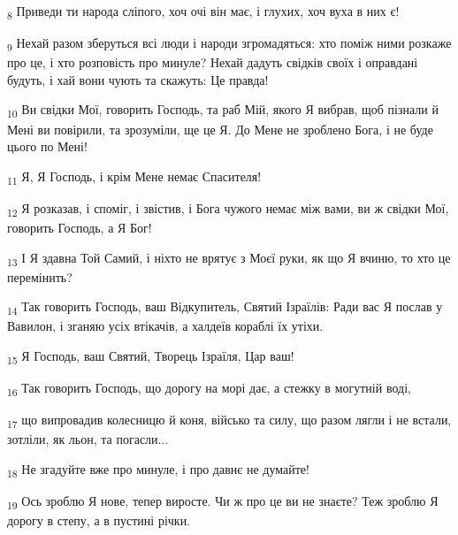 \begin{tcolorbox}
\textsubscript{8} Приведи ти народа сліпого, хоч очі він має, і глухих, хоч вуха в них є!
\end{tcolorbox}
\begin{tcolorbox}
\textsubscript{9} Нехай разом зберуться всі люди і народи згромадяться: хто поміж ними розкаже про це, і хто розповість про минуле? Нехай дадуть свідків своїх і оправдані будуть, і хай вони чують та скажуть: Це правда!
\end{tcolorbox}
\begin{tcolorbox}
\textsubscript{10} Ви свідки Мої, говорить Господь, та раб Мій, якого Я вибрав, щоб пізнали й Мені ви повірили, та зрозуміли, ще це Я. До Мене не зроблено Бога, і не буде цього по Мені!
\end{tcolorbox}
\begin{tcolorbox}
\textsubscript{11} Я, Я Господь, і крім Мене немає Спасителя!
\end{tcolorbox}
\begin{tcolorbox}
\textsubscript{12} Я розказав, і споміг, і звістив, і Бога чужого немає між вами, ви ж свідки Мої, говорить Господь, а Я Бог!
\end{tcolorbox}
\begin{tcolorbox}
\textsubscript{13} І Я здавна Той Самий, і ніхто не врятує з Моєї руки, як що Я вчиню, то хто це перемінить?
\end{tcolorbox}
\begin{tcolorbox}
\textsubscript{14} Так говорить Господь, ваш Відкупитель, Святий Ізраїлів: Ради вас Я послав у Вавилон, і зганяю усіх втікачів, а халдеїв кораблі їх утіхи.
\end{tcolorbox}
\begin{tcolorbox}
\textsubscript{15} Я Господь, ваш Святий, Творець Ізраїля, Цар ваш!
\end{tcolorbox}
\begin{tcolorbox}
\textsubscript{16} Так говорить Господь, що дорогу на морі дає, а стежку в могутній воді,
\end{tcolorbox}
\begin{tcolorbox}
\textsubscript{17} що випровадив колесницю й коня, військо та силу, що разом лягли і не встали, зотліли, як льон, та погасли...
\end{tcolorbox}
\begin{tcolorbox}
\textsubscript{18} Не згадуйте вже про минуле, і про давнє не думайте!
\end{tcolorbox}
\begin{tcolorbox}
\textsubscript{19} Ось зроблю Я нове, тепер виросте. Чи ж про це ви не знаєте? Теж зроблю Я дорогу в степу, а в пустині річки.
\end{tcolorbox}
